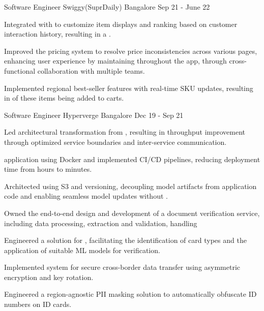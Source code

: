 \begin{cventries}
  \cventry
    {Software Engineer}
    {Swiggy(SuprDaily)}
    {Bangalore}
    {Sep 21 - June 22}
    {
      \begin{cvitems}
        \item {Integrated with  to customize item displays and ranking based on customer interaction history,
          resulting in a .}
        \item {Improved the pricing system to resolve price inconsistencies across various pages,
          enhancing user experience by maintaining  throughout the app, through
          cross-functional collaboration with multiple teams.}
        \item {Implemented regional best-seller features with real-time SKU updates, resulting in  of these items being added to carts.}
      \end{cvitems}
    }
  
  \cventry
    {Software Engineer}
    {Hyperverge}
    {Bangalore}
    {Dec 19  - Sep 21}
    {
      \begin{cvitems}
        \item {Led architectural transformation from , resulting in  throughput improvement
          through optimized service boundaries and inter-service communication.}
          \item { application using Docker and implemented CI/CD pipelines, reducing deployment time from hours to minutes.}
        \item {Architected  using S3 and versioning, 
          decoupling model artifacts from application code and enabling seamless model updates without .}
        \item {Owned the end-to-end design and development of a document verification service, including data processing, extraction and validation, handling }
        \item {Engineered a solution for , facilitating the identification of card types and 
          the application of suitable ML models for verification.}
        \item {Implemented  system for secure cross-border data transfer using asymmetric encryption and key rotation.}
        \item {Engineered a region-agnostic PII masking solution to automatically obfuscate ID numbers on ID cards.}
      \end{cvitems}
    }

\end{cventries}
